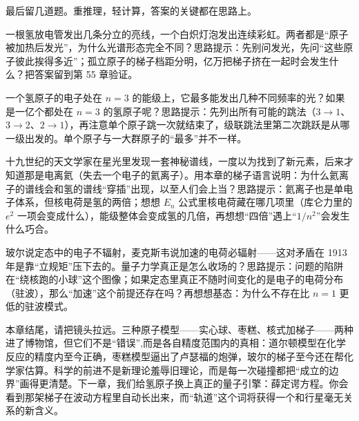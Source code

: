\begin{mainline}
最后留几道题。重推理，轻计算，答案的关键都在思路上。
\end{mainline}

\begin{puzzles}
\item 一根氢放电管发出几条分立的亮线，一个白炽灯泡发出连续彩虹。两者都是“原子被加热后发光”，为什么光谱形态完全不同？思路提示：先别问发光，先问“这些原子彼此挨得多近”；孤立原子的梯子档距分明，亿万把梯子挤在一起时会发生什么？把答案留到第 55 章验证。
\item 一个氢原子的电子处在 \(n=3\) 的能级上，它最多能发出几种不同频率的光？如果是一亿个都处在 \(n=3\) 的氢原子呢？思路提示：先列出所有可能的跳法（\(3\to1\)、\(3\to2\)、\(2\to1\)），再注意单个原子跳一次就结束了，级联跳法里第二次跳跃是从哪一级出发的。单个原子与一大群原子的“最多”并不一样。
\item 十九世纪的天文学家在星光里发现一套神秘谱线，一度以为找到了新元素，后来才知道那是电离氦（失去一个电子的氦离子）。用本章的梯子语言说明：为什么氦离子的谱线会和氢的谱线“穿插”出现，以至人们会上当？思路提示：氦离子也是单电子体系，但核电荷是氢的两倍；想想 \(E_{n}\) 公式里核电荷藏在哪几项里（库仑力里的 \(e^{2}\) 一项会变成什么），能级整体会变成氢的几倍，再想想“四倍”遇上“\(1/n^{2}\)”会发生什么巧合。
\item 玻尔说定态中的电子不辐射，麦克斯韦说加速的电荷必辐射——这对矛盾在 1913 年是靠“立规矩”压下去的。量子力学真正是怎么收场的？思路提示：问题的陷阱在“绕核跑的小球”这个图像；如果定态里真正不随时间变化的是电子的电荷分布（驻波），那么“加速”这个前提还存在吗？再想想基态：为什么不存在比 \(n=1\) 更低的驻波模式。
\end{puzzles}

\begin{mainline}
本章结尾，请把镜头拉远。三种原子模型——实心球、枣糕、核式加梯子——两种进了博物馆，但它们不是“错误”,而是各自精度范围内的真相：道尔顿模型在化学反应的精度内至今正确，枣糕模型逼出了卢瑟福的炮弹，玻尔的梯子至今还在帮化学家估算。科学的前进不是新理论羞辱旧理论，而是每一次碰撞都把“成立的边界”画得更清楚。下一章，我们给氢原子换上真正的量子引擎：薛定谔方程。你会看到那架梯子在波动方程里自动长出来，而“轨道”这个词将获得一个和行星毫无关系的新含义。
\end{mainline}
